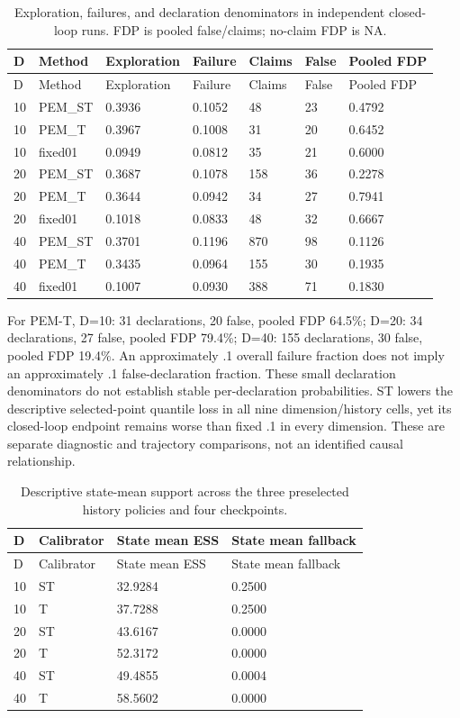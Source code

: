 \documentclass[cmc,article,submit,moreauthors,pdftex]{Definitions/tsp}
\begin{document}
\begin{longtable}[]{@{}lllllll@{}}
\caption{Exploration, failures, and declaration denominators in independent closed-loop runs. FDP is pooled false/claims; no-claim FDP is NA.}\tabularnewline
\toprule
D & Method & Exploration & Failure & Claims & False & Pooled FDP \\
\midrule
\endfirsthead
\toprule
D & Method & Exploration & Failure & Claims & False & Pooled FDP \\
\midrule
\endhead
10 & PEM\_ST & 0.3936 & 0.1052 & 48 & 23 & 0.4792 \\
10 & PEM\_T & 0.3967 & 0.1008 & 31 & 20 & 0.6452 \\
10 & fixed01 & 0.0949 & 0.0812 & 35 & 21 & 0.6000 \\
20 & PEM\_ST & 0.3687 & 0.1078 & 158 & 36 & 0.2278 \\
20 & PEM\_T & 0.3644 & 0.0942 & 34 & 27 & 0.7941 \\
20 & fixed01 & 0.1018 & 0.0833 & 48 & 32 & 0.6667 \\
40 & PEM\_ST & 0.3701 & 0.1196 & 870 & 98 & 0.1126 \\
40 & PEM\_T & 0.3435 & 0.0964 & 155 & 30 & 0.1935 \\
40 & fixed01 & 0.1007 & 0.0930 & 388 & 71 & 0.1830 \\
\bottomrule
\end{longtable}

For PEM-T, D=10: 31 declarations, 20 false, pooled FDP 64.5\%; D=20: 34 declarations, 27 false, pooled FDP 79.4\%; D=40: 155 declarations, 30 false, pooled FDP 19.4\%. An approximately .1 overall failure fraction does not imply an approximately .1 false-declaration fraction. These small declaration denominators do not establish stable per-declaration probabilities. ST lowers the descriptive selected-point quantile loss in all nine dimension/history cells, yet its closed-loop endpoint remains worse than fixed .1 in every dimension. These are separate diagnostic and trajectory comparisons, not an identified causal relationship.

\begin{longtable}[]{@{}llll@{}}
\caption{Descriptive state-mean support across the three preselected history policies and four checkpoints.}\tabularnewline
\toprule
D & Calibrator & State mean ESS & State mean fallback \\
\midrule
\endfirsthead
\toprule
D & Calibrator & State mean ESS & State mean fallback \\
\midrule
\endhead
10 & ST & 32.9284 & 0.2500 \\
10 & T & 37.7288 & 0.2500 \\
20 & ST & 43.6167 & 0.0000 \\
20 & T & 52.3172 & 0.0000 \\
40 & ST & 49.4855 & 0.0004 \\
40 & T & 58.5602 & 0.0000 \\
\bottomrule
\end{longtable}
\end{document}

